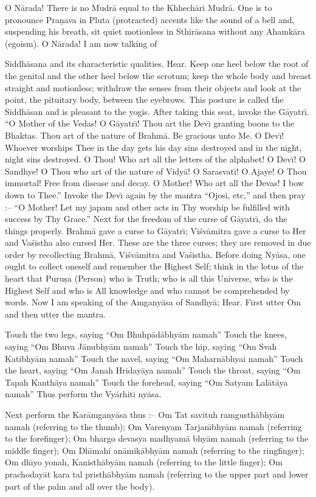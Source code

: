 O N\=arada! There is no Mudr\=a equal to the Khhech\=ari Mudr\=a. One is to pronounce Pra\d{n}ava in Pluta (protracted) accents like the sound of a bell and, suspending his breath, sit quiet motionless in Sthir\=asana without any Ahamk\=ara (egoism). O N\=arada! I am now talking of

Siddh\=asana and its characteristic qualities. Hear. Keep one heel below the root of the genital and the other heel below the scrotum; keep the whole body and breast straight and motionless; withdraw the senses from their objects and look at the point, the pituitary body, between the eyebrows. This posture is called the Siddh\=asan and is pleasant to the yogis. After taking this seat, invoke the G\=ayatr\={\i}. ``O Mother of the Vedas! O G\=ayatr\={\i}! Thou art the Dev\={\i} granting boons to the Bhaktas. Thou art of the nature of Brahm\=a. Be gracious unto Me. O Dev\={\i}! Whoever worships Thee in the day gets his day sins destroyed and in the night, night sins destroyed. O Thou! Who art all the letters of the alphabet! O Dev\={\i}! O Sandhye! O Thou who art of the nature of Vidy\=a! O Sarasvat\={\i}! O Ajaye! O Thou immortal! Free from disease and decay. O Mother! Who art all the Devas! I bow down to Thee.'' Invoke the Dev\={\i} again by the mantra ``Ojosi, etc,'' and then pray :-- ``O Mother! Let my japam and other acts in Thy worship be fulfilled with success by Thy Grace.'' Next for the freedom of the curse of G\=ayatr\={\i}, do the things properly. Brahm\=a gave a curse to G\=ayatr\={\i}; Vi\'sv\=amitra gave a curse to Her and Va\'sistha also cursed Her. These are the three curses; they are removed in due order by recollecting Brahm\=a, Vi\'sv\=amitra and Va\'sistha. Before doing Ny\=asa, one ought to collect oneself and remember the Highest Self; think in the lotus of the heart that Puru\d{s}a (Person) who is Truth; who is all this Universe, who is the Highest Self and who is All knowledge and who cannot be comprehended by words. Now I am speaking of the Amgany\=asa of Sandhy\=a; Hear. First utter Om and then utter the mantra.

Touch the two legs, saying ``Om Bhuhp\=ad\=abhy\=am namah''
Touch the knees, saying ``Om Bhuva J\=anubhy\=am namah''
Touch the hip, saying ``Om Svah Katibhy\=am namah''
Touch the navel, saying ``Om Maharn\=abhyai namah''
Touch the heart, saying ``Om Janah Hriday\=aya namah''
Touch the throat, saying ``Om Tapah Kanth\=aya namah''
Touch the forehead, saying ``Om Satyam Lal\=at\=aya namah''
Thus perform the Vy\=arhiti ny\=asa.

Next perform the Kar\=amgany\=asa thus :-- Om Tat savituh ramgusth\=abhy\=am namah (referring to the thumb); Om Varenyam Tarjan\={\i}bhy\=am namah (referring to the forefinger); Om bhargo devasya madhyam\=a bhy\=am namah (referring to the middle finger); Om Dh\={\i}mahi an\=amik\=abhy\=am namah (referring to the ringfinger); Om dh\={\i}yo yonah, Kanisth\=aby\=am namah (referring to the little finger); Om prachoday\=at kara tal pristh\=abhy\=am namah (referring to the upper part and lower part of the palm and all over the body).

